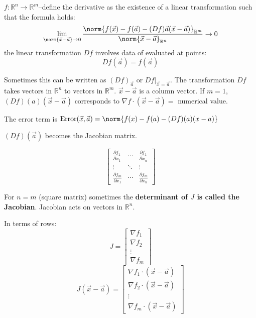 \documentclass{scrreprt}
\begin{document}
\begin{definition}[Deriative]
	$f:\mathbb{R}^n\rightarrow \mathbb{R}^m$--define the derivative as the existence
	of a linear transformation such that the formula holds:
	\[
		\lim_{\norm{\vec{x}-\vec{a}}\rightarrow 0}
		\frac{\norm{f(\vec{x}) - f(\vec{a}) - (Df)\vec{a}(\vec{x}-\vec{a})}_{\mathbb{R}^m}}
		{\norm{\vec{x}-\vec{a}}_{\mathbb{R}^n}} \rightarrow 0
	\]
	the linear transformation $Df$ involves data of evaluated at points:
	\[
		Df(\vec{a}) = f(\vec{a})
	\]
\end{definition}
Sometimes this can be written as $(Df)_{\vec{a}}$ or
$Df\rvert_{\vec{x}=\vec{a}}$. The transformation $Df$ takes vectors in
$\mathbb{R}^n$ to vectors in $\mathbb{R}^m$. $\vec{x}-\vec{a}$ is a column vector.
If $m=1$, $(Df)(a)(\vec{x}-\vec{a})$ corresponds to $\nabla f\cdot (\vec{x}-\vec{a})=$ numerical value.

The error term is $\text{Error}(\vec{x}, \vec{a})=\norm{f(x)-f(a)-(Df)(a)(x-a)}$

\begin{definition}
	$(Df)(\vec{a})$ becomes the Jacobian matrix.

	\[
		\begin{bmatrix}
			\frac{\partial f_1}{\partial x_1} & \cdots & \frac{\partial f_1}{\partial x_n} \\
			\vdots                            & \ddots & \vdots                            \\
			\frac{\partial f_m}{\partial x_1} & \cdots & \frac{\partial f_m}{\partial x_n}
		\end{bmatrix}
	\]
\end{definition}

For $n=m$ (square matrix) sometimes the \textbf{determinant of $J$ is called the Jacobian}.
Jacobian acts on vectors in $\mathbb{R}^n$.

In terms of rows:
\[
	J = \begin{bmatrix}
		\nabla f_1 \\
		\nabla f_2 \\
		\vdots     \\
		\nabla f_m
	\end{bmatrix}
\]
\[
	J(\vec{x}-\vec{a}) = \begin{bmatrix}
		\nabla f_1\cdot (\vec{x}-\vec{a}) \\
		\nabla f_2\cdot (\vec{x}-\vec{a}) \\
		\vdots                            \\
		\nabla f_m\cdot (\vec{x}-\vec{a})
	\end{bmatrix}
\]
\end{document}

